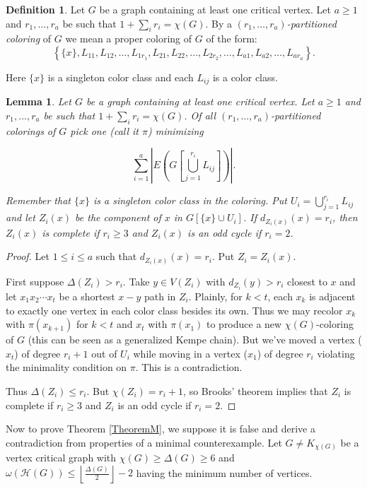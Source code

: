 \documentclass[11pt]{amsart}
\theoremstyle{plain}
\newtheorem{lem}[thm]{Lemma}
\theoremstyle{definition}
\newtheorem{defn}{Definition}
\theoremstyle{remark}
\begin{document}
\begin{defn}
Let $G$ be a graph containing at least one critical vertex.  Let $a \geq 1$ and $r_1, \ldots, r_a$ be such that $1 + \sum_i r_i = \chi(G)$. By a \emph{$(r_1, \ldots, r_a)$-partitioned coloring} of $G$ we mean a proper coloring of $G$ of the form:
\[\left\{\{x\}, L_{11}, L_{12}, \ldots, L_{1r_1}, L_{21}, L_{22}, \ldots, L_{2r_2}, \ldots, L_{a1}, L_{a2}, \ldots, L_{ar_a}\right\}.\]

\noindent Here $\{x\}$ is a singleton color class and each $L_{ij}$ is a color class.
\end{defn}

\begin{lem}\label{mozlemma}
Let $G$ be a graph containing at least one critical vertex.   Let $a \geq 1$ and $r_1, \ldots, r_a$ be such that $1 + \sum_i r_i = \chi(G)$. Of all $(r_1, \ldots, r_a)$-partitioned colorings of $G$ pick one (call it $\pi$) minimizing

\[\sum_{i = 1}^a \left|E\left(G\left[\bigcup_{j = 1}^{r_i} L_{ij}\right]\right)\right|.\]

\noindent Remember that $\{x\}$ is a singleton color class in the coloring. Put $U_i = \bigcup_{j = 1}^{r_i} L_{ij}$ and let $Z_i(x)$ be the component of $x$ in $G[\{x\} \cup U_i]$.  If $d_{Z_i(x)}(x) = r_i$, then $Z_i(x)$ is complete if $r_i \geq 3$ and $Z_i(x)$ is an odd cycle if $r_i = 2$.
\end{lem}
\begin{proof}
Let $1 \leq i \leq a$ such that $d_{Z_i(x)}(x) = r_i$. Put $Z_i = Z_i(x)$.

First suppose $\Delta(Z_i) > r_i$.  Take $y \in V(Z_i)$ with $d_{Z_i}(y) > r_i$ closest to $x$ and let $x_1x_2\cdots x_t$ be a shortest $x-y$ path in $Z_i$.  Plainly, for $k < t$, each $x_k$ is adjacent to exactly one vertex in each color class besides its own.  Thus we may recolor $x_k$ with $\pi(x_{k + 1})$ for $k < t$ and $x_t$ with $\pi(x_1)$ to produce a new $\chi(G)$-coloring of $G$ (this can be seen as a generalized Kempe chain).  But we've moved a vertex ($x_t$) of degree $r_i + 1$ out of $U_i$ while moving in a vertex ($x_1$) of degree $r_i$ violating the minimality condition on $\pi$.  This is a contradiction.

Thus $\Delta(Z_i) \leq r_i$.  But $\chi(Z_i) = r_i + 1$, so Brooks' theorem implies that $Z_i$ is complete if $r_i \geq 3$ and $Z_i$ is an odd cycle if $r_i = 2$.
\end{proof}

Now to prove Theorem \ref{TheoremM}, we suppose it is false and derive a contradiction from properties of a minimal counterexample.  Let $G \neq K_{\chi(G)}$ be a vertex critical graph with $\chi(G) \geq \Delta(G) \geq 6$ and $\omega(\mathcal{H}(G)) \leq \left \lfloor \frac{\Delta(G)}{2} \right \rfloor - 2$ having the minimum number of vertices.
\end{document}
